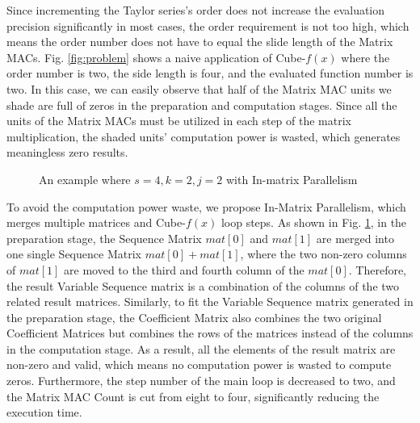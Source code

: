 \documentclass[12pt]{extbook}
\begin{document}
Since incrementing the Taylor series's order does not increase the evaluation precision significantly in most cases, the order requirement is not too high, which means the order number does not have to equal the slide length of the Matrix MACs. Fig. \ref{fig:problem} shows a naive application of Cube-$f(x)$ where the order number is two, the side length is four, and the evaluated function number is two. In this case, we can easily observe that half of the Matrix MAC units we shade are full of zeros in the preparation and computation stages. Since all the units of the Matrix MACs must be utilized in each step of the matrix multiplication, the shaded units' computation power is wasted, which generates meaningless zero results.

\begin{figure}[t]
    \caption{An example where $s = 4, k = 2, j = 2$ with In-matrix Parallelism}
    \label{fig:parallel}
    \end{figure}

To avoid the computation power waste, we propose In-Matrix Parallelism, which merges multiple matrices and Cube-$f(x)$ loop steps. As shown in Fig. \ref{fig:parallel}, in the preparation stage, the Sequence Matrix $mat[0]$ and $mat[1]$ are merged into one single Sequence Matrix $mat[0] + mat[1]$, where the two non-zero columns of $mat[1]$ are moved to the third and fourth column of the $mat[0]$. Therefore, the result Variable Sequence matrix is a combination of the columns of the two related result matrices. Similarly, to fit the Variable Sequence matrix generated in the preparation stage, the Coefficient Matrix also combines the two original Coefficient Matrices but combines the rows of the matrices instead of the columns in the computation stage. As a result, all the elements of the result matrix are non-zero and valid, which means no computation power is wasted to compute zeros. Furthermore, the step number of the main loop is decreased to two, and the Matrix MAC Count is cut from eight to four, significantly reducing the execution time.
\end{document}
